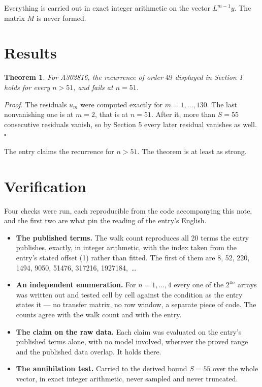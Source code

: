 \documentclass[11pt]{article}
\newtheorem{theorem}{Theorem}
\theoremstyle{definition}
\begin{document}
Everything is carried out in exact integer arithmetic on the vector $L^{m-1}y$. The matrix $M$ is never formed.

\section{Results}

\begin{theorem} For A302816, the recurrence of order $49$ displayed in Section 1 holds for every $n > 51$, and fails at $n = 51$.\end{theorem}

{\itshape Proof.} The residuals $u_m$ were computed exactly for $m = 1,\dots,130$. The last nonvanishing one is at $m = 2$, that is at $n = 51$. After it, more than $S = 55$ consecutive residuals vanish, so by Section 5 every later residual vanishes as well. $\square$

The entry claims the recurrence for $n > 51$. The theorem is at least as strong.

\section{Verification}

Four checks were run, each reproducible from the code accompanying this note, and the first two are what pin the reading of the entry's English.

\begin{itemize}

\item {\bfseries The published terms.} The walk count reproduces all 20 terms the entry publishes, exactly, in integer arithmetic, with the index taken from the entry's stated offset (1) rather than fitted. The first of them are 8, 52, 220, 1494, 9050, 51476, 317216, 1927184,~\dots

\item {\bfseries An independent enumeration.} For $n = 1,\dots,4$ every one of the $2^{4n}$ arrays was written out and tested cell by cell against the condition as the entry states it --- no transfer matrix, no row window, a separate piece of code. The counts agree with the walk count and with the entry.

\item {\bfseries The claim on the raw data.} Each claim was evaluated on the entry's published terms alone, with no model involved, wherever the proved range and the published data overlap. It holds there.

\item {\bfseries The annihilation test.} Carried to the derived bound $S = 55$ over the whole vector, in exact integer arithmetic, never sampled and never truncated.

\end{itemize}
\end{document}
